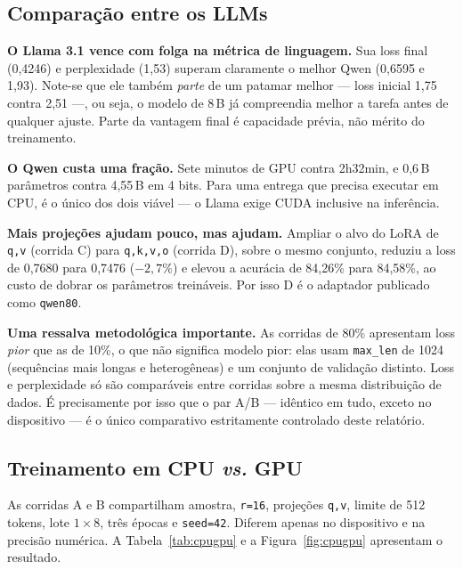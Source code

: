 \documentclass[12pt,a4paper]{article}
\begin{document}
\subsection{Comparação entre os LLMs}
\label{sec:comparallm}

\noindent\textbf{O Llama 3.1 vence com folga na métrica de linguagem.} Sua loss
final (0,4246) e perplexidade (1,53) superam claramente o melhor Qwen (0,6595 e
1,93). Note-se que ele também \emph{parte} de um patamar melhor --- loss inicial
1,75 contra 2,51 ---, ou seja, o modelo de 8\,B já compreendia melhor a tarefa
antes de qualquer ajuste. Parte da vantagem final é capacidade prévia, não mérito
do treinamento.

\medskip
\noindent\textbf{O Qwen custa uma fração.} Sete minutos de GPU contra 2h32min, e
0,6\,B parâmetros contra 4,55\,B em 4 bits. Para uma entrega que precisa executar
em CPU, é o único dos dois viável --- o Llama exige CUDA inclusive na inferência.

\medskip
\noindent\textbf{Mais projeções ajudam pouco, mas ajudam.} Ampliar o alvo do
LoRA de \texttt{q,v} (corrida C) para \texttt{q,k,v,o} (corrida D), sobre o mesmo
conjunto, reduziu a loss de 0,7680 para 0,7476 ($-2{,}7\%$) e elevou a acurácia
de 84,26\% para 84,58\%, ao custo de dobrar os parâmetros treináveis. Por isso D
é o adaptador publicado como \texttt{qwen80}.

\medskip
\noindent\textbf{Uma ressalva metodológica importante.} As corridas de 80\%
apresentam loss \emph{pior} que as de 10\%, o que não significa modelo pior: elas
usam \texttt{max\_len} de 1024 (sequências mais longas e heterogêneas) e um
conjunto de validação distinto. Loss e perplexidade só são comparáveis entre
corridas sobre a mesma distribuição de dados. É precisamente por isso que o par
A/B --- idêntico em tudo, exceto no dispositivo --- é o único comparativo
estritamente controlado deste relatório.

\subsection{Treinamento em CPU \emph{vs.} GPU}
\label{sec:cpugpu}

As corridas A e B compartilham amostra, \texttt{r=16}, projeções \texttt{q,v},
limite de 512 tokens, lote $1\times8$, três épocas e \texttt{seed=42}. Diferem
apenas no dispositivo e na precisão numérica. A Tabela~\ref{tab:cpugpu} e a
Figura~\ref{fig:cpugpu} apresentam o resultado.
\end{document}
